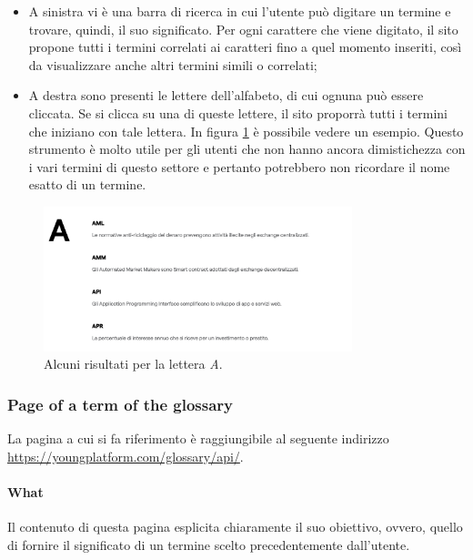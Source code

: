 \begin{itemize}
  \item A sinistra vi è una barra di ricerca in cui l'utente può digitare 
  un termine e trovare, quindi, il suo significato. Per ogni carattere che 
  viene digitato, il sito propone tutti i termini correlati ai caratteri 
  fino a quel momento inseriti, così da visualizzare anche altri termini 
  simili o correlati;
  \item A destra sono presenti le lettere dell'alfabeto, di cui ognuna 
  può essere cliccata. Se si clicca su una di queste lettere, il sito 
  proporrà tutti i termini che iniziano con tale lettera. In figura 
  \ref{fig:glossary-3} è possibile vedere un esempio. Questo strumento è 
  molto utile per gli utenti che non hanno ancora dimistichezza con i vari 
  termini di questo settore e pertanto potrebbero non ricordare il nome 
  esatto di un termine.
\end{itemize}

\begin{figure}[H]
  \centering
  \includegraphics[width=0.80\textwidth]{res/images/internal-pages/glossary/glossary-3.png}
  \caption{Alcuni risultati per la lettera \textit{A}.}
  \label{fig:glossary-3}
\end{figure}

\subsubsection{Page of a term of the glossary}

La pagina a cui si fa riferimento è raggiungibile al seguente indirizzo \\
\href{https://youngplatform.com/glossary/api/}{https://youngplatform.com/glossary/api/}.

\paragraph{What}

Il contenuto di questa pagina esplicita chiaramente il suo obiettivo, ovvero, 
quello di fornire il significato di un termine scelto precedentemente 
dall'utente.

